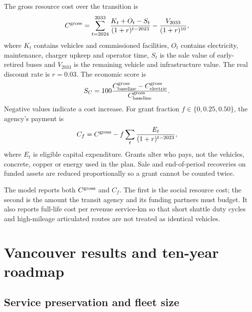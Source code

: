 \documentclass[12pt,letterpaper]{article}
\begin{document}
The gross resource cost over the transition is
\begin{equation}
C^{\rm gross}=\sum_{t=2024}^{2033}\frac{K_t+O_t-S_t}{(1+r)^{t-2023}}
-\frac{V_{2033}}{(1+r)^{10}},
\end{equation}
where $K_t$ contains vehicles and commissioned facilities, $O_t$ contains electricity, maintenance, charger upkeep and operator time, $S_t$ is the sale value of early-retired buses and $V_{2033}$ is the remaining vehicle and infrastructure value. The real discount rate is $r=0.03$. The economic score is
\begin{equation}
S_C=100\frac{C^{\rm gross}_{\rm baseline}-C^{\rm gross}_{\rm electric}}{C^{\rm gross}_{\rm baseline}}.
\end{equation}
Negative values indicate a cost increase. For grant fraction $f\in\{0,0.25,0.50\}$, the agency's payment is
\begin{equation}
C_f=C^{\rm gross}-f\sum_t\frac{E_t}{(1+r)^{t-2023}},
\end{equation}
where $E_t$ is eligible capital expenditure. Grants alter who pays, not the vehicles, concrete, copper or energy used in the plan. Sale and end-of-period recoveries on funded assets are reduced proportionally so a grant cannot be counted twice.

The model reports both $C^{\rm gross}$ and $C_f$. The first is the social resource cost; the second is the amount the transit agency and its funding partners must budget. It also reports full-life cost per revenue service-km so that short shuttle duty cycles and high-mileage articulated routes are not treated as identical vehicles.

\FloatBarrier
\section{Vancouver results and ten-year roadmap}

\subsection{Service preservation and fleet size}
\end{document}
